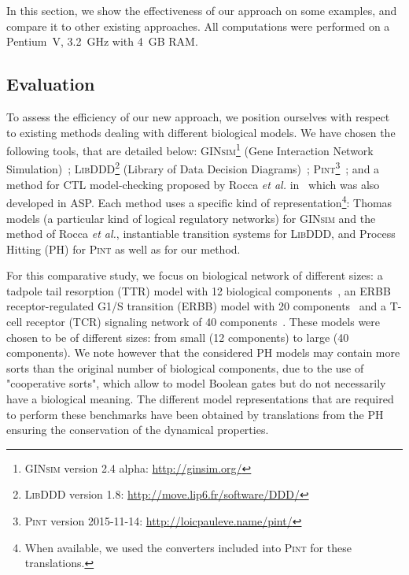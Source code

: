In this section, we show the effectiveness of our approach on some examples,
and compare it to other existing approaches.
All computations were performed on a Pentium~V, 3.2~GHz with 4~GB RAM.

\subsection{Evaluation}
To assess the efficiency of our new approach,
we position ourselves with respect to existing methods dealing with different biological models.
We have chosen the following tools, that are detailed below: 
\textsc{GINsim}\footnote{\textsc{GINsim} version 2.4 alpha: \url{http://ginsim.org/}} (Gene Interaction Network Simulation)~\cite{gonzalez2006ginsim,naldi2009logical,naldi2007decision};
\textsc{LibDDD}\footnote{\textsc{LibDDD} version 1.8: \url{http://move.lip6.fr/software/DDD/}}
(Library of Data Decision Diagrams)~\cite{thierry2009hierarchical,colange2013towards};
\textsc{Pint}\footnote{\textsc{Pint} version 2015-11-14: \url{http://loicpauleve.name/pint/}}~\cite{PMR12-MSCS};
and a method for CTL model-checking proposed by Rocca \textit{et al.} in~\cite{roccaasp}
which was also developed in ASP.
Each method uses a specific kind of representation\footnote{When available, we used the converters included into \textsc{Pint} for these translations.}:
Thomas models (a particular kind of logical regulatory networks) for \textsc{GINsim}
and the method of Rocca \textit{et al.},
instantiable transition systems for \textsc{LibDDD},
and Process Hitting (PH) for \textsc{Pint} as well as for our method.

For this comparative study, we focus on biological network of different sizes:
a tadpole tail resorption (TTR) model with 12 biological components~\cite{khalis2009smbionet},
an ERBB receptor-regulated G1/S transition (ERBB) model with 20 components~\cite{Samaga2009}
and a T-cell receptor (TCR) signaling network of 40 components~\cite{Klamt06}.
These models were chosen to be of different sizes:
from small (12 components) to large (40 components).
We note however that the considered PH models may contain more sorts than
the original number of biological components, due to the use of "cooperative sorts", which allow to model Boolean gates but do not necessarily
have a biological meaning.
The different model representations that are required to perform these benchmarks have been obtained by translations
from the PH
ensuring the conservation of the dynamical properties.

